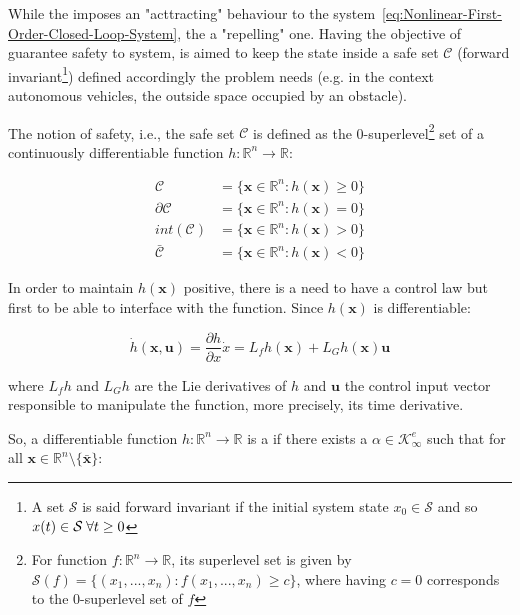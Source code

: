 While the  imposes an "acttracting" behaviour to the system~\ref{eq:Nonlinear-First-Order-Closed-Loop-System}, the  a "repelling" one. Having the objective of guarantee safety to system, is aimed to keep the state inside a safe set \(\mathcal{C}\) (forward invariant\footnote{A set \(\mathcal{S}\) is said forward invariant if the initial system state \( x_0 \in \mathcal{S}\) and so \(x(t) \in \mathcal{S} \hspace{0.25em} \forall t \geq 0\) }) defined accordingly the problem needs (e.g. in the context autonomous vehicles, the outside space occupied by an obstacle).\par 
The notion of safety, i.e., the safe set \(\mathcal{C}\) is defined as the 0-superlevel\footnote{For function \(f: \mathbb{R}^n \to \mathbb{R}\), its superlevel set is given by \(\mathcal{S}(f) = \{(x_1,...,x_n): f(x_1,...,x_n) \geq c\}\), where having \(c = 0\) corresponds to the 0-superlevel set of \(f\)} set of a continuously differentiable function \( h: \mathbb{R}^n \rightarrow \mathbb{R}  \):

\begin{align}
        \mathcal{C} &= \{ \mathbf{x} \in \mathbb{R}^n : h( \mathbf{x} )\geq 0\} \label{eq:safe-set}\\
        \partial\mathcal{C} &= \{ \mathbf{x} \in \mathbb{R}^n : h( \mathbf{x} ) = 0\} \label{eq:boundary_safe_set}\\
        int(\mathcal{C}) &= \{ \mathbf{x} \in \mathbb{R}^n : h( \mathbf{x} ) > 0\} \label{eq:interior_safe_set} \\
        \bar{\mathcal{C}} &= \{ \mathbf{x} \in \mathbb{R}^n : h( \mathbf{x} ) < 0\} \label{eq:unsafe_set}
\end{align}


In order to maintain  \(h( \mathbf{x} )\) positive, there is a need to have a control law but first to be able to interface with the function. Since \(h( \mathbf{x} )\) is differentiable:  

\[\dot{h}(\mathbf{x}, \mathbf{u}) = \frac{\partial h}{\partial x}\dot{x} = L_fh(\mathbf{x}) + L_Gh(\mathbf{x})\mathbf{u} \]

where \(L_fh\) and \(L_Gh\) are the Lie derivatives of \(h\) and \(\mathbf{u}\) the control input vector responsible to manipulate the function, more precisely, its time derivative.\par

So, a differentiable function \( h: \mathbb{R}^n \rightarrow \mathbb{R}  \) is a  if there exists a \( \alpha \in \mathcal{K}^e_{\infty}  \) such that for all \( \mathbf{x} \in \mathbb{R}^n \setminus \{\bar{\mathbf{x}}\} \):

